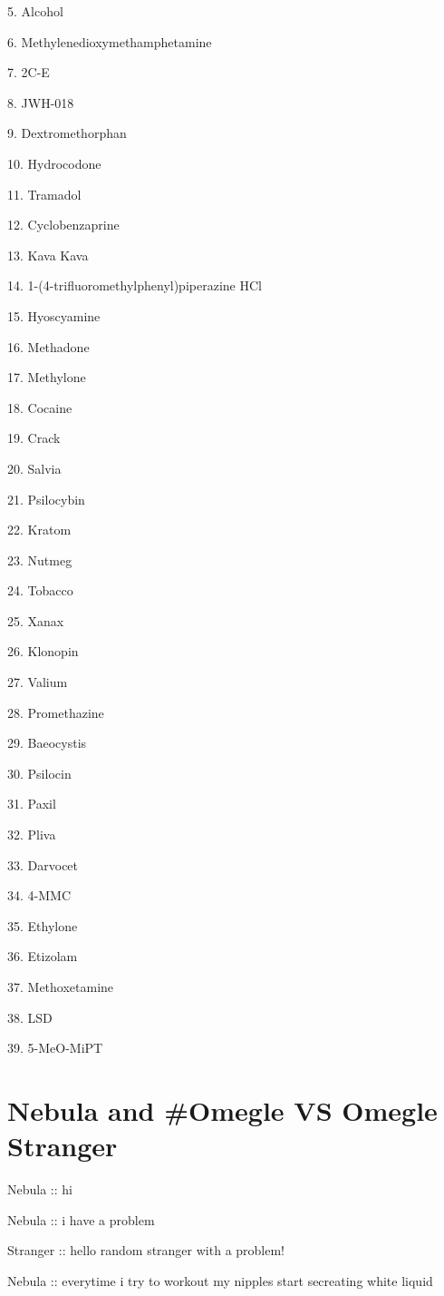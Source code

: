 \documentclass[a1paper]{article}
\begin{document}
\begin{multicols}{7}
{5.  Alcohol

6.  Methylenedioxymethamphetamine

7.  2C-E

8.  JWH-018

9.  Dextromethorphan

10. Hydrocodone

11. Tramadol

12. Cyclobenzaprine

13. Kava Kava

14. 1-(4-trifluoromethylphenyl)piperazine HCl

15. Hyoscyamine

16. Methadone

17. Methylone

18. Cocaine

19. Crack

20. Salvia

21. Psilocybin

22. Kratom

23. Nutmeg

24. Tobacco

25. Xanax

26. Klonopin

27. Valium

28. Promethazine

29. Baeocystis

30. Psilocin

31. Paxil

32. Pliva

33. Darvocet

34. 4-MMC

35. Ethylone

36. Etizolam

37. Methoxetamine

38. LSD

39. 5-MeO-MiPT
\setlength{\parskip}{0.8em}






\section{Nebula and \#Omegle VS Omegle Stranger}

\setlength{\parskip}{0cm}

Nebula :: hi

Nebula :: i have a problem

Stranger :: hello random stranger with a problem!

Nebula :: everytime i try to workout my nipples start secreating white liquid

}
\end{multicols}
\end{document}
